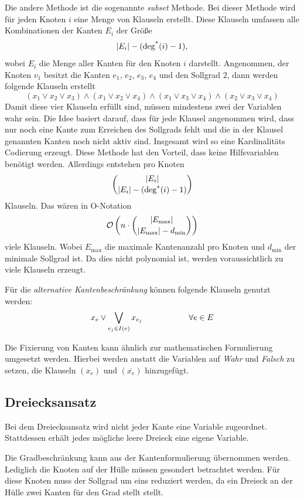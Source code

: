 Die andere Methode ist die sogenannte \emph{subset} Methode.
Bei dieser Methode wird für jeden Knoten \(i\) eine Menge von Klauseln erstellt.
Diese Klauseln umfassen alle Kombinationen der Kanten \(E_i\) der Größe \[\left|E_i\right| - (\operatorname{deg^*}(i) - 1),\]
wobei \(E_i\) die Menge aller Kanten für den Knoten \(i\) darstellt.
Angenommen, der Knoten \(v_1\) besitzt die Kanten \(e_1\), \(e_2\), \(e_3\), \(e_4\) und den Sollgrad \(2\), dann werden folgende Klauseln erstellt
\[
	(x_1 \lor x_2 \lor x_3) \land (x_1 \lor x_2 \lor x_4) \land (x_1 \lor x_3 \lor x_4) \land (x_2 \lor x_3 \lor x_4)
\]
Damit diese vier Klauseln erfüllt sind, müssen mindestens zwei der Variablen wahr sein.
Die Idee basiert darauf, dass für jede Klausel angenommen wird, dass nur noch eine Kante zum Erreichen des Sollgrads fehlt und die in der Klausel genannten Kanten noch nicht aktiv sind.
Insgesamt wird so eine Kardinalitäts Codierung erzeugt.
Diese Methode hat den Vorteil, dass keine Hilfsvariablen benötigt werden.
Allerdings entstehen pro Knoten \[\binom{\left|E_i\right|}{\left|E_i\right| - (\operatorname{deg^*}(i) - 1)}\] Klauseln.
Das wären in O-Notation \[\mathcal{O}\left(n\cdot \binom{\left|E_{\text{max}}\right|}{\left|E_{\text{max}}\right| - d_{\text{min}}}\right)\] viele Klauseln.
 Wobei \(E_{\text{max}}\) die maximale Kantenanzahl pro Knoten und \(d_{\text{min}}\) der minimale Sollgrad ist.
 Da dies nicht polynomial ist, werden voraussichtlich zu viele Klauseln erzeugt.

Für die \emph{alternative Kantenbeschränkung} können folgende Klauseln genutzt werden:
\[
x_e \lor \bigvee_{e_j \in I(e)} x_{e_j} \hspace{2cm} \forall e \in E
\]

Die Fixierung von Kanten kann ähnlich zur mathematischen Formulierung umgesetzt werden.
Hierbei werden anstatt die Variablen auf \emph{Wahr} und \emph{Falsch} zu setzen, die Klauseln \((x_e)\) und \((\overline{x_e})\) hinzugefügt.

\subsection{Dreiecksansatz}
Bei dem Dreiecksansatz wird nicht jeder Kante eine Variable zugeordnet. 
Stattdessen erhält jedes mögliche leere Dreieck eine eigene Variable.

Die Gradbeschränkung kann aus der Kantenformulierung übernommen werden.
Lediglich die Knoten auf der Hülle müssen gesondert betrachtet werden.
Für diese Knoten muss der Sollgrad um eins reduziert werden, da ein Dreieck an der Hülle zwei Kanten für den Grad stellt stellt.


